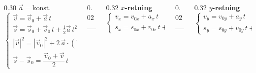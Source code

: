 \documentclass[aspectratio=169, 12pt]{beamer}
\begin{document}
\begin{frame}{}

  \begin{columns}[T]
    \begin{column}{0.30\textwidth}
      \centering
      {\Large $\vec{a} = \text{konst.}$}\\[10pt]
      \footnotesize
      $\displaystyle
      \left\{\begin{array}{l}
        \vec{v} = \vec{v}_0 + \vec{a}\,t \\[10pt]
        \vec{s} = \vec{s}_0 + \vec{v}_0\,t + \tfrac{1}{2}\vec{a}\,t^2 \\[10pt]
        |\vec{v}|^2 = |\vec{v}_0|^2 + 2\,\vec{a}\cdot(\vec{s}-\vec{s}_0) \\[10pt]
        \vec{s}-\vec{s}_0 = \dfrac{\vec{v}_0+\vec{v}}{2}\,t
      \end{array}\right.$
    \end{column}
    \pause
    \begin{column}{0.02\textwidth}
      \centering
      \ifdarkmode\color{white!25!gray}\else\color{black!20}\fi
      \rule{0.4pt}{4.3cm}
    \end{column}
    \begin{column}{0.32\textwidth}
      \centering
      {\large\bfseries $x$-retning}\\[10pt]
      \footnotesize
      $\displaystyle
      \left\{\begin{array}{l}
        v_x = v_{0x} + a_x\,t \\[14pt]
        s_x = s_{0x} + v_{0x}\,t + \tfrac{1}{2}a_x\,t^2
      \end{array}\right.$
    \end{column}
    \pause
    \begin{column}{0.02\textwidth}
      \centering
      \ifdarkmode\color{white!25!gray}\else\color{black!20}\fi
      \rule{0.4pt}{4.3cm}
    \end{column}
    \begin{column}{0.32\textwidth}
      \centering
      {\large\bfseries $y$-retning}\\[10pt]
      \footnotesize
      $\displaystyle
      \left\{\begin{array}{l}
        v_y = v_{0y} + a_y\,t \\[14pt]
        s_y = s_{0y} + v_{0y}\,t + \tfrac{1}{2}a_y\,t^2
      \end{array}\right.$
    \end{column}
  \end{columns}

\end{frame}
\end{document}
